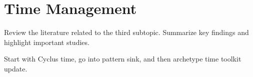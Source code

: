 \section{Time Management}
\label{sec:time_method}
Review the literature related to the third subtopic. Summarize key findings and highlight important studies.

Start with Cyclus time, go into pattern sink, and then archetype time toolkit update.